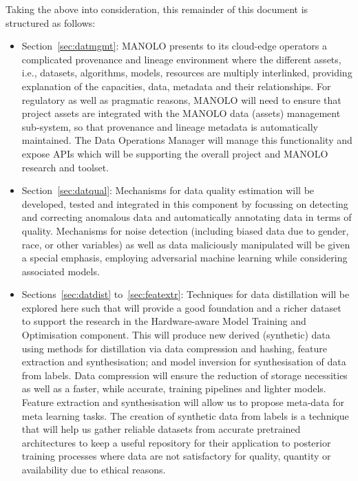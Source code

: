 \documentclass{manolo}
\begin{document}
Taking the above into consideration, this remainder of this document
is structured as follows:
%
\begin{itemize}
\item Section~\ref{sec:datmgmt}: MANOLO presents to its cloud-edge operators
  a complicated provenance and lineage environment where the different
  assets, i.e., datasets, algorithms, models, resources are multiply
  interlinked, providing explanation of the capacities, data, metadata
  and their relationships. For regulatory as well as pragmatic
  reasons, MANOLO will need to ensure that project assets are
  integrated with the MANOLO data (assets) management sub-system, so
  that provenance and lineage metadata is automatically maintained.
  The Data Operations Manager will manage this functionality and
  expose APIs which will be supporting the overall project and MANOLO
  research and toolset.
\item Section~\ref{sec:datqual}: Mechanisms for data quality estimation will
  be developed, tested and integrated in this component by focussing
  on detecting and correcting anomalous data and automatically
  annotating data in terms of quality. Mechanisms for noise detection
  (including biased data due to gender, race, or other variables) as
  well as data maliciously manipulated will be given a special
  emphasis, employing adversarial machine learning while considering
  associated models.
\item Sections~\ref{sec:datdist} to~\ref{sec:featextr}:
  Techniques for data distillation will be
  explored here such that will provide a good foundation and a richer
  dataset to support the research in the Hardware-aware Model Training
  and Optimisation component. This will produce new derived
  (synthetic) data using methods for distillation via data compression
  and hashing, feature extraction and synthesisation; and model
  inversion for synthesisation of data from labels. Data compression
  will ensure the reduction of storage necessities as well as a
  faster, while accurate, training pipelines and lighter
  models. Feature extraction and synthesisation will allow us to
  propose meta-data for meta learning tasks. The creation of synthetic
  data from labels is a technique that will help us gather reliable
  datasets from accurate pretrained architectures to keep a useful
  repository for their application to posterior training processes
  where data are not satisfactory for quality, quantity or
  availability due to ethical reasons.
\end{itemize}
\end{document}
